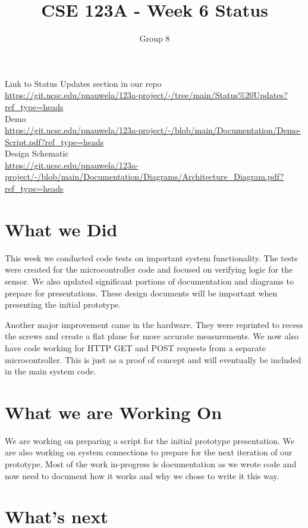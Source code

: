 \documentclass[12pt]{article}
\title{CSE 123A - Week 6 Status}
\author{Group 8}
\date{}
\begin{document}
\pagestyle{fancy}
\maketitle

\fancyfoot{}
\fancyhead{}
\fancyfoot[R]{\thepage}

\noindent Link to Status Updates section in our repo \\
\url{https://git.ucsc.edu/pnauwela/123a-project/-/tree/main/Status\%20Updates?ref_type=heads}\\
\noindent Demo\\
\url{https://git.ucsc.edu/pnauwela/123a-project/-/blob/main/Documentation/Demo-Script.pdf?ref_type=heads}\\
\noindent Design Schematic\\
\url{https://git.ucsc.edu/pnauwela/123a-project/-/blob/main/Documentation/Diagrams/Architecture_Diagram.pdf?ref_type=heads}\\
\section*{What we Did}
This week we conducted code tests on important system functionality. The tests were created for the microcontroller code and focused on verifying logic for the sensor. We also updated significant portions of documentation and diagrams to prepare for presentations. These design documents will be important when presenting the initial prototype. 

Another major improvement came in the hardware. They were reprinted to recess the screws and create a flat plane for more accurate measurements. We now also have code working for HTTP GET and POST requests from a separate microcontroller. This is just as a proof of concept and will eventually be included in the main system code. 
 
\section*{What we are Working On}

We are working on preparing a script for the initial prototype presentation. We are also working on system connections to prepare for the next iteration of our prototype. Most of the work in-progress is documentation as we wrote code and now need to document how it works and why we chose to write it this way. 

\section*{What's next}
\end{document}
